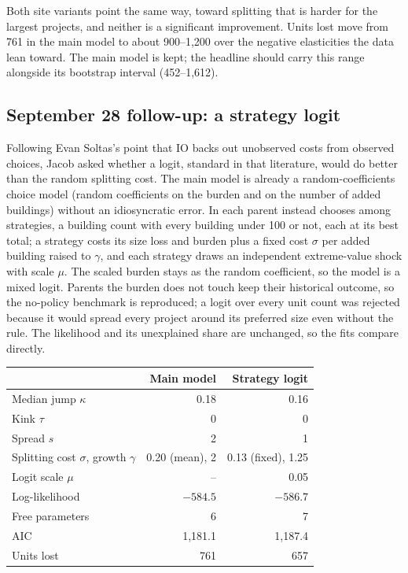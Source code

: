 Both site variants point the same way, toward splitting that is harder for
the largest projects, and neither is a significant improvement. Units lost
move from 761 in the main model to about 900--1,200 over the negative
elasticities the data lean toward. The main model is kept; the headline
should carry this range alongside its bootstrap interval (452--1,612).

\subsection*{September 28 follow-up: a strategy logit}

Following Evan Soltas's point that IO backs out unobserved costs from
observed choices, Jacob asked whether a logit, standard in that literature,
would do better than the random splitting cost. The main model is already a
random-coefficients choice model (random coefficients on the burden and on
the number of added buildings) without an idiosyncratic error. In
 each parent instead chooses among strategies, a
building count with every building under 100 or not, each at its best total;
a strategy costs its size loss and burden plus a fixed cost $\sigma$ per added
building raised to $\gamma$, and each strategy draws an independent
extreme-value shock with scale $\mu$. The scaled burden stays as the random
coefficient, so the model is a mixed logit. Parents the burden does not touch
keep their historical outcome, so the no-policy benchmark is reproduced; a
logit over every unit count was rejected because it would spread every
project around its preferred size even without the rule. The likelihood and
its unexplained share are unchanged, so the fits compare directly.

\begin{center}
\small
\begin{tabular}{lrr}
\hline
 & Main model & Strategy logit \\
\hline
Median jump $\kappa$ & 0.18 & 0.16 \\
Kink $\tau$ & 0 & 0 \\
Spread $s$ & 2 & 1 \\
Splitting cost $\sigma$, growth $\gamma$ & 0.20 (mean), 2 & 0.13 (fixed), 1.25 \\
Logit scale $\mu$ & -- & 0.05 \\
Log-likelihood & $-584.5$ & $-586.7$ \\
Free parameters & 6 & 7 \\
AIC & 1,181.1 & 1,187.4 \\
Units lost & 761 & 657 \\
\hline
\end{tabular}
\end{center}

